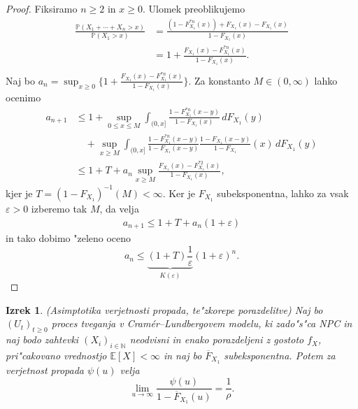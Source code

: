\documentclass[12pt, a4paper, reqno]{amsart}
\theoremstyle{definition}
\theoremstyle{plain}
\newtheorem{izrek}[definicija]{Izrek}
\newcommand{\N}{\mathbb{N}}
\newcommand{\E}{\mathbb{E}}
\newcommand{\Prob}{\mathbb{P}}
\newcommand{\1}{\mathds{1}}
\begin{document}
        \begin{proof}
            Fiksiramo $n\geq2$ in $x\geq0$. Ulomek preoblikujemo
            \begin{align*}
                \frac{\Prob(X_1 + \cdots + X_n > x)}{\Prob(X_1 > x)} 
                &= \frac{(1 - F_{X_1}^{*n}(x)) + F_{X_1}(x) - F_{X_1}(x)}{1 - F_{X_1}(x)} \\
                &= 1 + \frac{F_{X_1}(x) - F_{X_1}^{*n}(x)}{1 - F_{X_1}(x)}. \\
            \end{align*}
            Naj bo $a_n = \sup_{x\geq0}\biggl\{ 1 + \frac{F_{X_1}(x) - F_{X_1}^{*n}(x)}{1 - F_{X_1}(x)}\biggr\}.$ Za 
            konstanto $M\in(0, \infty)$ lahko ocenimo
            \begin{align*}
                a_{n+1} &\leq 1 + \sup_{0\leq x\leq M}\int_{(0,x]}\frac{1 - F_{X_1}^{*n}(x - y)}{1 - F_{X_1}(x)}\, dF_{X_1}(y) \\
                            & \quad + \sup_{x\geq M}\int_{(0, x]}\frac{1 - F_{X_1}^{*n}(x - y)}{1 - F_{X_1}(x - y)}\frac{1 - F_{X_1}(x - y)}{1 - F_{X_1}}(x) \, dF_{X_1}(y) \\
                        &\leq 1 + T + a_n\sup_{x\geq M}\frac{F_{X_1}(x) - F_{X_1}^{*2}(x)}{1 - F_{X_1}(x)},
            \end{align*}
            kjer je $T = (1 - F_{X_1})^{-1}(M) < \infty$. Ker je $F_{X_1}$ subeksponentna, lahko 
            za vsak $\varepsilon > 0$ izberemo tak $M$, da velja
            \begin{align*}
                a_{n+1} \leq 1 + T + a_n(1 + \varepsilon)
            \end{align*}
            in tako dobimo "zeleno oceno
            \begin{equation*}
                a_n \leq \underbrace{(1 + T)\frac{1}{\varepsilon}}_{K(\varepsilon)}(1 + \varepsilon)^n.
            \end{equation*}
        \end{proof}
        
        \begin{izrek}(Asimptotika verjetnosti propada, te"zkorepe porazdelitve)
            Naj bo $(U_t)_{t\geq0}$ proces tveganja v Cramér--Lundbergovem modelu, ki zado"s"ca NPC in 
            naj bodo zahtevki $(X_i)_{i\in\N}$ neodvisni in enako porazdeljeni z gostoto $f_X$, 
            pri"cakovano vrednostjo $\E\left[X\right] < \infty$ in naj bo $\overline{F}_{X_1}$ subeksponentna.
            Potem za verjetnost propada $\psi(u)$ velja
            \begin{equation}
                \lim_{u\to\infty}\frac{\psi(u)}{1 - \overline{F}_{X_1}(u)} = \frac{1}{\rho}.
                \label{eq:tezkorepnePorazdelitveAsimptotika}
            \end{equation}
            \label{izr:tezkorepnePorazdelitveAsimptotika}
        \end{izrek}
\end{document}
